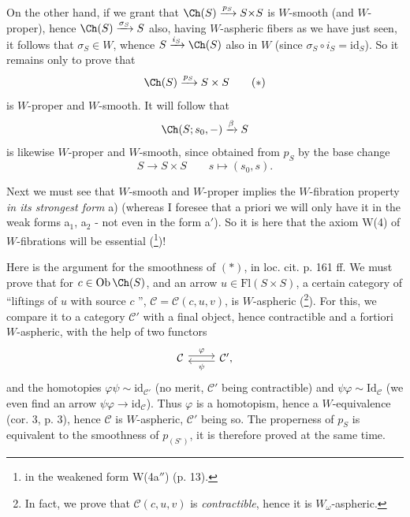 On the other hand, if we grant that $\Ch(S) \xrightarrow{p_S} S{\times}S$ is $W$-smooth (and $W$-proper), hence $\Ch(S) \xrightarrow{\sigma_S} S$ also, having $W$-aspheric fibers as we have just seen, it follows that $\sigma_S \in W$, whence $S \xrightarrow{i_S} \Ch(S)$ also in $W$ (since $\sigma_S \circ i_S = \mathrm{id}_S$). So it remains only to prove that
\[ \Ch(S) \xrightarrow{p_S} S \times S \tag*{$(*)$} \]
is $W$-proper and $W$-smooth. It will follow that
\[ \Ch(S; s_0, -) \xrightarrow{\beta} S \]
is likewise $W$-proper and $W$-smooth, since obtained from $p_S$ by the base change
\[ S \longrightarrow S \times S \qquad s \longmapsto (s_0, s). \]

Next we must see that $W$-smooth and $W$-proper implies the $W$-fibration property \textit{in its strongest form} a) (whereas I foresee that a priori we will only have it in the weak forms a$_1$, a$_2$ - not even in the form a$'$). So it is here that the axiom W(4) of $W$-fibrations will be essential (\footnote[15]{in the weakened form W(4a$''$) (p. 13).})!

Here is the argument for the smoothness of $(*)$, in loc. cit. p. 161 ff. We must prove that for $c \in \mathrm{Ob}\,\Ch(S)$, and an arrow $u \in \mathrm{Fl}(S \times S)$, a certain category of ``liftings of $u$ with source $c$ '', $\mathcal{C} = \mathcal{C}(c,u,v)$, is $W$-aspheric (\footnote[16]{In fact, we prove that $\mathcal{C}(c,u,v)$ is \textit{contractible}, hence it is $W_\omega$-aspheric.}). For this, we compare it to a category $\mathcal{C}'$ with a final object, hence contractible and a fortiori $W$-aspheric, with the help of two functors
\[ \begin{tikzcd} \mathcal{C} \arrow[r, shift left, "\varphi"] & \mathcal{C}', \arrow[l, shift left, "\psi"] \end{tikzcd} \]
and the homotopies $\varphi\psi \sim \mathrm{id}_{\mathcal{C}'}$ (no merit, $\mathcal{C}'$ being contractible)
and $\psi\varphi \sim \mathrm{Id}_{\mathcal{C}}$ (we even find an arrow $\psi\varphi \longrightarrow \mathrm{id}_{\mathcal{C}}$). Thus $\varphi$ is a homotopism, hence a $W$-equivalence (cor. 3, p. 3), hence $\mathcal{C}$ is $W$-aspheric, $\mathcal{C}'$ being so. The properness of $p_S$ is equivalent to the smoothness of $p_{(S^\circ)}$, it is therefore proved at the same time.
